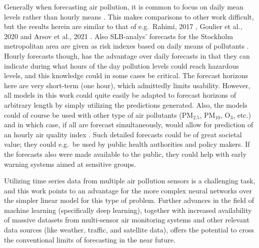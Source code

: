 Generally when forecasting air pollution, it is common to focus on daily mean levels rather than hourly means \cite{atmos7020015, Shams2021}. This makes comparisons to other work difficult, but the results herein are similar to that of e.g.\ Rahimi, 2017 \cite{Rahimi2017}, Goulier et al., 2020\cite{Goulier2020} and Arsov et al., 2021 \cite{Arsov2021}. Also SLB-analys' forecasts for the Stockholm metropolitan area are given as risk indexes based on daily means of pollutants \cite{slbanalys}. Hourly forecasts though, has the advantage over daily forecasts in that they can indicate during what hours of the day pollution levels could reach hazardous levels, and this knowledge could in some cases be critical. The forecast horizons here are very short-term (one hour), which admittedly limits usability. However, all models in this work could quite easily be adapted to forecast horizons of arbitrary length by simply utilizing the predictions generated. Also, the models could of course be used with other type of air pollutants (PM$_{2.5}$, PM$_{10}$, O$_3$, etc.) and in which case, if all are forecast simultaneously, would allow for prediction of an hourly air quality index \cite{VanLoon2010}. Such detailed forecasts could be of great societal value; they could e.g.\ be used by public health authorities and policy makers. If the forecasts also were made available to the public, they could help with early warning systems aimed at sensitive groups.

Utilizing time series data from multiple air pollution sensors is a challenging task, and this work points to an advantage for the more complex neural networks over the simpler linear model for this type of problem. 
%
Further advances in the field of machine learning (specifically deep learning), together with increased availability of massive datasets from multi-sensor air monitoring systems and other relevant data sources (like weather, traffic, and satellite data), offers the potential to cross the conventional limits of forecasting in the near future. 

